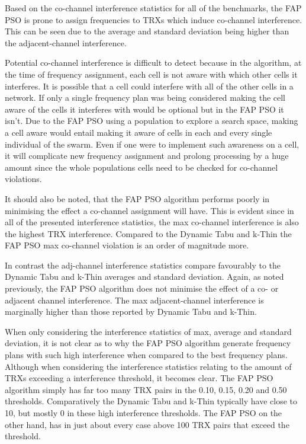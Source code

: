 Based on the co-channel interference statistics for all of the benchmarks, the FAP PSO is prone to assign frequencies to TRXs which induce co-channel interference. This can be seen due to the average and standard deviation being higher than the adjacent-channel interference.

Potential co-channel interference is difficult to detect because in the algorithm, at the time of frequency assignment, each cell is not aware with which other cells it interferes. It is possible that a cell could interfere with all of the other cells in a network. If only a single frequency plan was being considered making the cell aware of the cells it interferes with would be optional but in the FAP PSO it isn't. Due to the FAP PSO using a population to explore a search space, making a cell aware would entail making it aware of cells in each and every single individual of the swarm. Even if one were to implement such awareness on a cell, it will complicate new frequency assignment and prolong processing by a huge amount since the whole populations cells need to be checked for co-channel violations.

It should also be noted, that the FAP PSO algorithm performs poorly in minimising the effect a co-channel assignment will have. This is evident since in all of the presented interference statistics, the max co-channel interference is also the highest TRX interference. Compared to the Dynamic Tabu and k-Thin the FAP PSO max co-channel violation is an order of magnitude more.

In contrast the adj-channel interference statistics compare favourably to the Dynamic Tabu and k-Thin averages and standard deviation. Again, as noted previously, the FAP PSO algorithm does not minimise the effect of a co- or adjacent channel interference. The max adjacent-channel interference is marginally higher than those reported by Dynamic Tabu and k-Thin.

When only considering the interference statistics of max, average and standard deviation, it is not clear as to why the FAP PSO algorithm generate frequency plans with such high interference when compared to the best frequency plans. Although when considering the interference statistics relating to the amount of TRXs exceeding a interference threshold, it becomes clear. The FAP PSO algorithm simply has far too many TRX pairs in the 0.10, 0.15, 0.20 and 0.50 thresholds. Comparatively the Dynamic Tabu and k-Thin typically have close to 10, but mostly 0 in these high interference thresholds. The FAP PSO on the other hand, has in just about every case above 100 TRX pairs that exceed the threshold.

